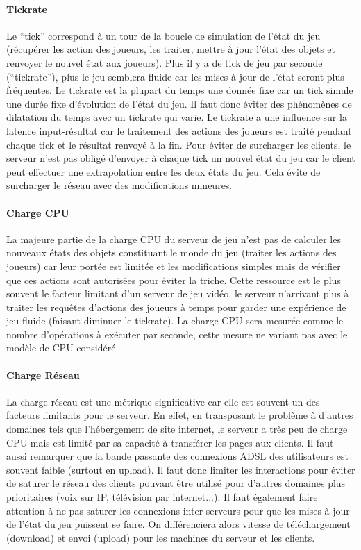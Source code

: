 \paragraph{Tickrate\\}
Le ``tick'' correspond à un tour de la boucle de simulation de l'état du jeu (récupérer les action des joueurs, les traiter, mettre à jour l'état des objets et renvoyer le nouvel état aux joueurs). Plus il y a de tick de jeu par seconde (``tickrate''), plus le jeu semblera fluide car les mises à jour de l'état seront plus fréquentes. Le tickrate est la plupart du temps une donnée fixe car un tick simule une durée fixe d'évolution de l'état du jeu. Il faut donc éviter des phénomènes de dilatation du temps avec un tickrate qui varie. Le tickrate a une influence sur la latence input-résultat car le traitement des actions des joueurs est traité pendant chaque tick et le résultat renvoyé à la fin. Pour éviter de surcharger les clients, le serveur n'est pas obligé d'envoyer à chaque tick un nouvel état du jeu car le client peut effectuer une extrapolation entre les deux états du jeu. Cela évite de surcharger le réseau avec des modifications mineures.

\paragraph{Charge CPU\\}
La majeure partie de la charge CPU du serveur de jeu n'est pas de calculer les nouveaux états des objets constituant le monde du jeu (traiter les actions des joueurs) car leur portée est limitée et les modifications simples mais de vérifier que ces actions sont autorisées pour éviter la triche. Cette ressource est le plus souvent le facteur limitant d'un serveur de jeu vidéo, le serveur n'arrivant plus à traiter les requêtes d'actions des joueurs à temps pour garder une expérience de jeu fluide (faisant diminuer le tickrate). La charge CPU sera mesurée comme le nombre d'opérations à exécuter par seconde, cette mesure ne variant pas avec le modèle de CPU considéré.

\paragraph{Charge Réseau\\}
La charge réseau est une métrique significative car elle est souvent un des facteurs limitants pour le serveur. En effet, en transposant le problème à d'autres domaines tels que l'hébergement de site internet, le serveur a très peu de charge CPU mais est limité par sa capacité à transférer les pages aux clients. Il faut aussi remarquer que la bande passante des connexions ADSL des utilisateurs est souvent faible (surtout en upload). Il faut donc limiter les interactions pour éviter de saturer le réseau des clients pouvant être utilisé pour d'autres domaines plus prioritaires (voix sur IP, télévision par internet...). Il faut également faire attention à ne pas saturer les connexions inter-serveurs pour que les mises à jour de l'état du jeu puissent se faire. On différenciera alors vitesse de téléchargement (download) et envoi (upload) pour les machines du serveur et les clients.

